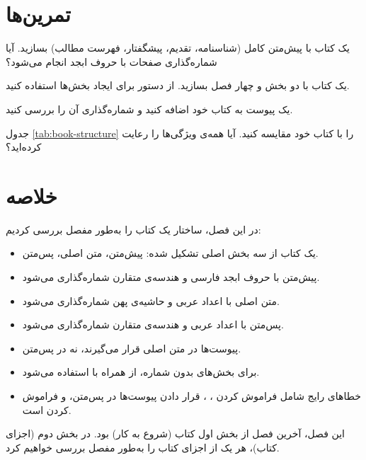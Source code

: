 \section{تمرین‌ها}
\label{sec:book-structure-exercises}

\begin{exercise}
    یک کتاب با پیش‌متن کامل (شناسنامه، تقدیم،
    پیشگفتار، فهرست مطالب) بسازید. آیا
    شماره‌گذاری صفحات با حروف ابجد انجام
    می‌شود؟
    \label{exc:book-structure-frontmatter}
\end{exercise}

\begin{exercise}
    یک کتاب با دو بخش و چهار فصل بسازید.
    از دستور  برای ایجاد بخش‌ها
    استفاده کنید.
    \label{exc:book-structure-parts}
\end{exercise}

\begin{exercise}
    یک پیوست به کتاب خود اضافه کنید و
    شماره‌گذاری آن را بررسی کنید.
    \label{exc:book-structure-appendix}
\end{exercise}

\begin{exercise}
    جدول \cref{tab:book-structure} را با
    کتاب خود مقایسه کنید. آیا همه‌ی
    ویژگی‌ها را رعایت کرده‌اید؟
    \label{exc:book-structure-compare}
\end{exercise}

\section{خلاصه}
\label{sec:book-structure-summary}

در این فصل، ساختار یک کتاب  را
به‌طور مفصل بررسی کردیم:

\begin{itemize}
    \item یک کتاب از سه بخش اصلی تشکیل شده:
    پیش‌متن، متن اصلی، پس‌متن.

    \item پیش‌متن با حروف ابجد فارسی و هندسه‌ی
    متقارن شماره‌گذاری می‌شود.

    \item متن اصلی با اعداد عربی و حاشیه‌ی پهن
    شماره‌گذاری می‌شود.

    \item پس‌متن با اعداد عربی و هندسه‌ی متقارن
    شماره‌گذاری می‌شود.

    \item پیوست‌ها در متن اصلی قرار می‌گیرند،
    نه در پس‌متن.

    \item برای بخش‌های بدون شماره، از
     همراه با 
    استفاده می‌شود.

    \item خطاهای رایج شامل فراموش کردن
    ، ،
    قرار دادن پیوست‌ها در پس‌متن، و فراموش
    کردن  است.
\end{itemize}

این فصل، آخرین فصل از بخش اول کتاب (شروع به
کار) بود. در بخش دوم (اجزای کتاب)، هر یک از
اجزای کتاب را به‌طور مفصل بررسی خواهیم کرد.